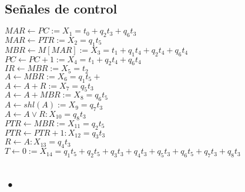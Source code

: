 \documentclass{article}
\begin{document}
\subsection*{Señales de control}
$MAR \leftarrow PC := X_1= t_0 + q_2t_3+q_6t_3$\\
$MAR \leftarrow PTR := X_2=q_1t_5$\\

\noindent $MBR\leftarrow M[MAR]:= X_3= t_1+q_1t_4+q_2t_4+q_6t_4$\\

\noindent $PC\leftarrow PC+1:= X_4=t_1+q_2t_4+q_6t_4$\\

\noindent $IR\leftarrow MBR:= X_5 = t_2$\\

\noindent $A\leftarrow MBR:= X_6= q_1t_5 + $\\
$A\leftarrow A+ R:= X_{7}=q_5t_3$\\
$A\leftarrow A +MBR:= X_{8}= q_6t_5$\\
$A\leftarrow shl(A):=X_{9}=q_7t_3$\\
$A\leftarrow A\lor R: X_{10}=q_8t_3$\\

\noindent $PTR \leftarrow MBR:= X_{11}=q_2t_5$\\
$PTR\leftarrow PTR+1: X_{12}=q_3t_3$\\

\noindent $R \leftarrow A: X_{13}=q_4t_3$\\

\noindent $T\leftarrow 0 := X_{14} = q_1t_5+q_2t_5+q_3t_3+q_4t_3+q_5t_3+q_6t_5+q_7t_3+q_8t_3$\\

\subsection{•}
\end{document}
